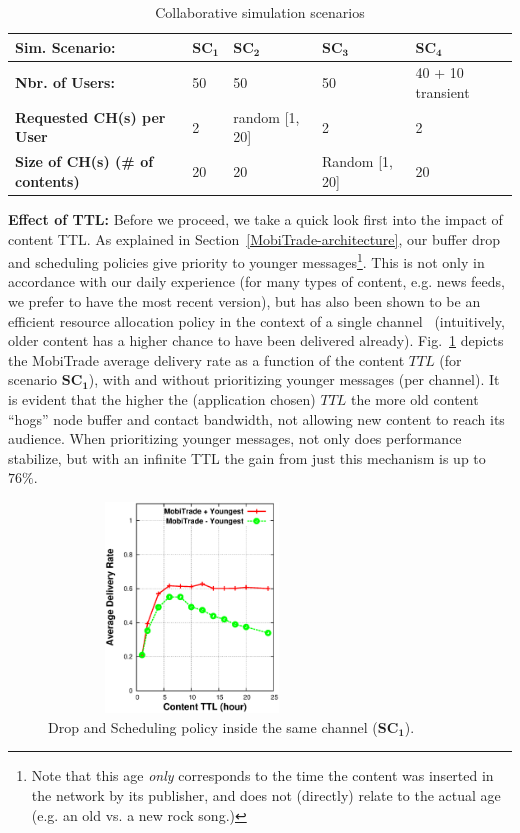 \begin{table}[!h]
\vspace{-0.1in}
\caption{Collaborative simulation scenarios}
\centering
\label{table:c-sim-sce}
\footnotesize
\begin{tabular}{|p{3cm}|p{2cm}|p{2cm}|p{2cm}|p{2cm}|}
\hline
\bfseries Sim. Scenario: & $\mathbf{SC_1}$ & $\mathbf{SC_2}$ & $\mathbf{SC_3}$&  $\mathbf{SC_4}$ \\
\hline
\bfseries Nbr. of Users: & 50 & 50 & 50 & 40 + 10 transient\\
\hline
\bfseries Requested CH(s) per User & 2 & random [1, 20]& 2& 2\\
\hline
\bfseries Size of CH(s) (\# of contents) &20  &20 &Random [1, 20]&20 \\
\hline
\end{tabular}
\end{table}

\noindent \textbf{Effect of TTL:} Before we proceed, we take a quick look first into the impact of content TTL. As explained in Section~\ref{MobiTrade-architecture}, our buffer drop and scheduling policies give priority to younger messages\footnote{Note that this age \emph{only} corresponds to the time the content was inserted in the network by its publisher, and does not (directly) relate to the actual age (e.g. an old vs. a new rock song.)}. This is not only in accordance with our daily experience (for many types of content, e.g. news feeds, we prefer to have the most recent version), but has also been shown to be an efficient resource allocation policy in the context of a single channel~\cite{TMC:Report} (intuitively, older content has a higher chance to have been delivered already). Fig.~\ref{DO} depicts the MobiTrade average delivery rate as a function of the content $TTL$ (for scenario $\mathbf{SC_1}$), with and without prioritizing younger messages (per channel). It is evident that the higher the (application chosen) $TTL$ the more old content ``hogs'' node buffer and contact bandwidth, not allowing new content to reach its audience. When prioritizing younger messages, not only does performance stabilize, but with an infinite TTL the gain from just this mechanism is up to $76\%$.

\begin{figure}[!h]
  \begin{center}
    \includegraphics[width=3in,height=2.2in]{Chapitre5/fig3.eps}
  \end{center}
  \caption{Drop and Scheduling policy inside the same channel ($\mathbf{SC_1}$).}
  \label{DO}
\end{figure}

